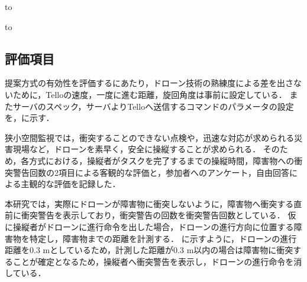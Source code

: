 \documentclass[submit, sigrecommended]{ipsj}
\begin{document}


\begin{table}[tb] 
  \caption{サーバの性能} 
  \label{tab:server_spec}
  \hbox to
\end{table}


\begin{table}[tb] 
  \caption{ドローンへ送信するコマンドのパラメータ} 
  \label{tab:command_parameter}
  \hbox to
\end{table}


\subsection{評価項目}
提案方式の有効性を評価するにあたり，ドローン技術の熟練度による差を出さないために，Telloの速度，一度に進む距離，旋回角度は事前に設定している．
またサーバのスペック，サーバよりTelloへ送信するコマンドのパラメータの設定を，に示す．
\par
狭小空間監視では，衝突することのできない点検や，迅速な対応が求められる災害現場など，ドローンを素早く，安全に操縦することが求められる．
そのため，各方式における，操縦者がタスクを完了するまでの操縦時間，障害物への衝突警告回数の2項目による客観的な評価と，参加者へのアンケート，自由回答による主観的な評価を記録した．
\par
本研究では，実際にドローンが障害物に衝突しないように，障害物へ衝突する直前に衝突警告を表示しており，衝突警告の回数を衝突警告回数としている．
仮に操縦者がドローンに進行命令を出した場合，ドローンの進行方向に位置する障害物を特定し，障害物までの距離を計測する．
に示すように，ドローンの進行距離を0.3 mとしているため，計測した距離が0.3 m以内の場合は障害物に衝突することが確定となるため，操縦者へ衝突警告を表示し，ドローンの進行命令を消している．
\end{document}
